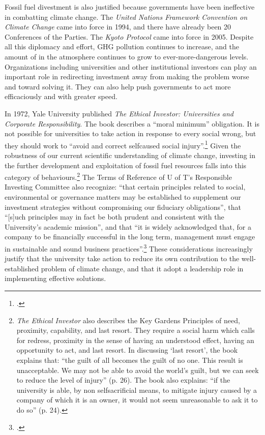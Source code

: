 \documentclass[10pt]{article}
\begin{document}
Fossil fuel divestment is also justified because governments have been ineffective in combatting climate change.
The \emph{United Nations Framework Convention on Climate Change} came into force in 1994, and there have already been 20 Conferences of the Parties.
The \emph{Kyoto Protocol} came into force in 2005.
Despite all this diplomacy and effort, GHG pollution continues to increase, and the amount of  in the atmosphere continues to grow to ever-more-dangerous levels.
Organizations including universities and other institutional investors can play an important role in redirecting investment away from making the problem worse and toward solving it.
They can also help push governments to act more efficaciously and with greater speed.



In 1972, Yale University published \emph{The Ethical Investor: Universities and Corporate Responsibility}.
The book describes a ``moral minimum'' obligation.
It is not possible for universities to take action in response to every social wrong, but they should work to ``avoid and correct self­caused social injury''.\footcite[][p. 21]{EthicalInvestor}
Given the robustness of our current scientific understanding of climate change, investing in the further development and exploitation of fossil fuel resources falls into this category of behaviours.\footnote{\emph{The Ethical Investor} also describes the Key Gardens Principles of need, proximity, capability, and last resort. 
They require a social harm which calls for redress, proximity in the sense of having an understood effect, having an opportunity to act, and last resort. 
In discussing `last resort', the book explains that: ``the guilt of all becomes the guilt of no one. This result is unacceptable. We may not be able to avoid the world's guilt, but we can seek to reduce the level of injury'' (p. 26). 
The book also explains: ``if the university is able, by non self­sacrificial means, to mitigate injury caused by a company of which it is an owner, it would not seem unreasonable to ask it to do so'' (p. 24).}
The Terms of Reference of U of T's Responsible Investing Committee also recognize: ``that certain principles related to social, environmental or governance matters may be established to supplement our investment strategies without compromising our fiduciary obligations'', that ``[s]uch principles may in fact be both prudent and consistent with the University's academic mission'', and that ``it is widely acknowledged that, for a company to be financially successful in the long term, management must engage in sustainable and sound business practices''.\footcite[][]{UTRICTOR}
These considerations increasingly justify that the university take action to reduce its own contribution to the well-established problem of climate change, and that it adopt a leadership role in implementing effective solutions.
\end{document}

